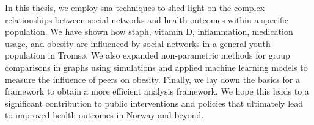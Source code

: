In this thesis, we employ \gls{sna} techniques to shed light on the complex relationships between social networks and health outcomes within a specific population. We have shown how \gls{staph}, vitamin D, inflammation, medication usage, and obesity are influenced by social networks in a general youth population in Tromsø. We also expanded non-parametric methods for group comparisons in graphs using simulations and applied machine learning models to measure the influence of peers on obesity. Finally, we lay down the basics for a framework to obtain a more efficient analysis framework. We hope this leads to a significant contribution to public interventions and policies that ultimately lead to improved health outcomes in Norway and beyond.
